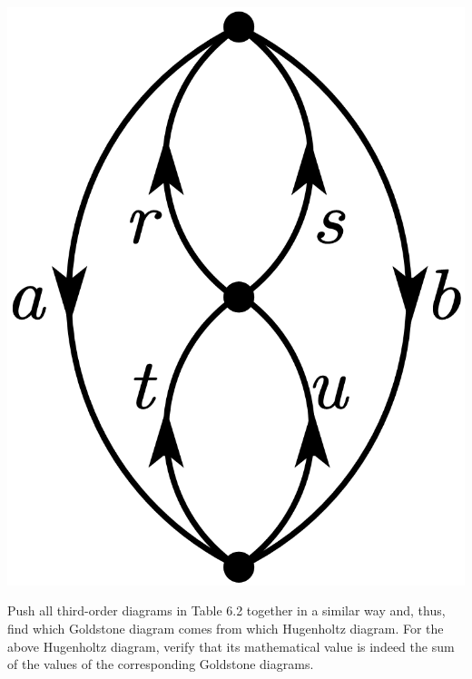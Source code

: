 \documentclass[a4paper]{book}
\newcounter{exercise}[chapter]
\begin{document}
\begin{exercise}
	\begin{center}
	\includegraphics[scale=0.9]{./pictures/6.12/exercise_2.png}
	\end{center}
	
	Push all third-order diagrams in Table 6.2 together in a similar way and, thus, find which Goldstone diagram comes from which Hugenholtz diagram. For the above Hugenholtz diagram, verify that its mathematical value is indeed the sum of the values of the corresponding Goldstone diagrams.
	
	\end{exercise}
	
\end{document}
